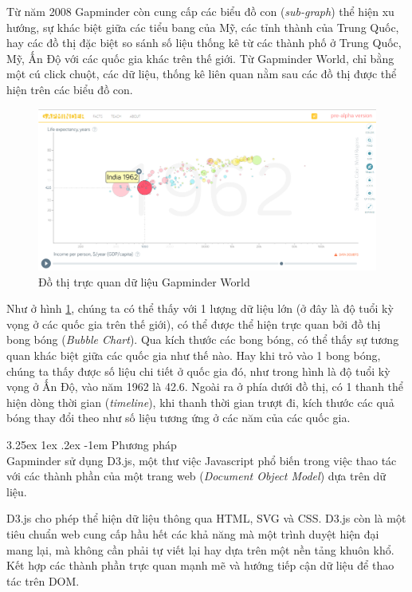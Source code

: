 \documentclass[12pt,a4paper,twoside]{article}
\makeatletter
\newcommand{\myparagraph}[1]{\paragraph{#1}\mbox{}\\} %
\renewcommand\paragraph{\@startsection{paragraph}{5}{\z@}%
  {3.25ex \@plus1ex \@minus.2ex}%
  {-1em}%
  {\normalfont\normalsize\bfseries}}
\makeatother
\begin{document}
Từ năm 2008 Gapminder còn cung cấp các biểu đồ con (\textit{sub-graph})\cite{subgraph} thể hiện xu hướng, sự khác biệt giữa các tiểu bang của Mỹ, các tỉnh thành của Trung Quốc, hay các đồ thị đặc biệt so sánh số liệu thống kê từ các thành phố ở Trung Quốc, Mỹ, Ấn Độ với các quốc gia khác trên thế giới. Từ Gapminder World, chỉ bằng một cú click chuột, các dữ liệu, thống kê liên quan nằm sau các đồ thị được thể hiện trên các biểu đồ con.

\begin{figure}[!h]
	\begin{center}
    \includegraphics[scale=.4]{image/gapminder}
    \caption{Đồ thị trực quan dữ liệu Gapminder World}
    \label{fig:gapminder}
	\end{center}
\end{figure}

Như ở hình \ref{fig:gapminder}, chúng ta có thể thấy với 1 lượng dữ liệu lớn (ở đây là độ tuổi kỳ vọng ở các quốc gia trên thế giới), có thể được thể hiện trực quan bởi đồ thị bong bóng (\textit{Bubble Chart}). Qua kích thước các bong bóng, có thể thấy sự tương quan khác biệt giữa các quốc gia như thế nào. Hay khi trỏ vào 1 bong bóng, chúng ta thấy được số liệu chi tiết ở quốc gia đó, như trong hình là độ tuổi kỳ vọng ở Ấn Độ, vào năm 1962 là 42.6. Ngoài ra ở phía dưới đồ thị, có 1 thanh thể hiện dòng thời gian (\textit{timeline}), khi thanh thời gian trượt đi, kích thước các quả bóng thay đổi theo như số liệu tương ứng ở các năm của các quốc gia.

\myparagraph{Phương pháp}
Gapminder sử dụng D3.js, một thư việc Javascript phổ biến trong việc thao tác với các thành phần của một trang web (\textit{Document Object Model}) dựa trên dữ liệu. 

D3.js cho phép thể hiện dữ liệu thông qua HTML, SVG và CSS. D3.js còn là một tiêu chuẩn web cung cấp hầu hết các khả năng mà một trình duyệt hiện đại mang lại, mà không cần phải tự viết lại hay dựa trên một nền tảng khuôn khổ. Kết hợp các thành phần trực quan mạnh mẽ và hướng tiếp cận dữ liệu để thao tác trên DOM.
\end{document}
